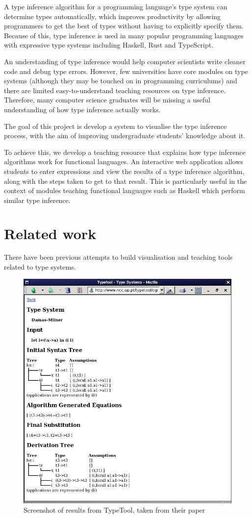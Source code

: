 \documentclass[a4paper,fleqn,twoside,12pt]{report}
\begin{document}
A type inference algorithm for a programming language’s type system can determine types automatically, which improves productivity by allowing programmers to get the best of types without having to explicitly specify them. Because of this, type inference is used in many popular programming languages with expressive type systems including Haskell, Rust and TypeScript.

An understanding of type inference would help computer scientists write cleaner code and debug type errors. However, few universities have core modules on type systems (although they may be touched on in programming curriculums) and there are limited easy-to-understand teaching resources on type inference. Therefore, many computer science graduates will be missing a useful understanding of how type inference actually works.

The goal of this project is develop a system to visualise the type inference process, with the aim of improving undergraduate students’ knowledge about it.

To achieve this, we develop a teaching resource that explains how type inference algorithms work for functional languages. An interactive web application allows students to enter expressions and view the results of a type inference algorithm, along with the steps taken to get to that result. This is particularly useful in the context of modules teaching functional languages such as Haskell which perform similar type inference.
\section{Related work}\label{id:h.2mwaav7jkal4}
There have been previous attempts to build visualisation and teaching tools related to type systems.

{\centering \begin{figure}[h!]
  \centering
  \includegraphics[width=0.770\linewidth]{images/image29.png}
  \caption{Screenshot of results from TypeTool, taken from their paper}
\end{figure} \par}
\end{document}
